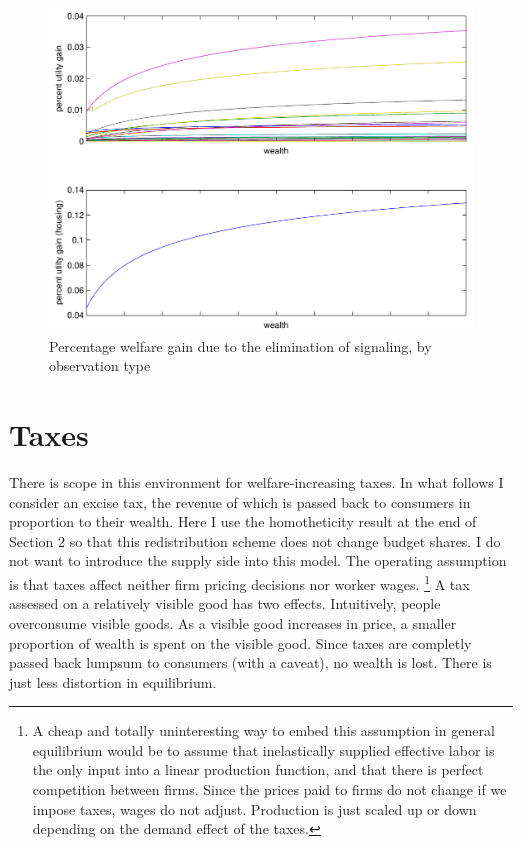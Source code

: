 \documentclass{article}
\begin{document}
\begin{figure}
	\begin{center}
		\includegraphics[scale=.8]{pics/uchnge_cropped.pdf}
	\end{center}
	\caption{Percentage welfare gain due to the elimination of signaling, by observation type}
	\label{fig:uchnge}
\end{figure}

\section{Taxes}
There is scope in this environment for welfare-increasing taxes.  
In what follows I consider an excise tax, the revenue of which is passed back to consumers in proportion to their wealth.
Here I use the homotheticity result at the end of Section 2 so that this redistribution scheme does not change budget shares.
I do not want to introduce the supply side into this model.
The operating assumption is that taxes affect neither firm pricing decisions nor worker wages.
\footnote{
A cheap and totally uninteresting way to embed this assumption in general equilibrium would be to assume that inelastically supplied effective labor is the only input into a linear production function, and that there is perfect competition between firms.
Since the prices paid to firms do not change if we impose taxes, wages do not adjust.
Production is just scaled up or down depending on the demand effect of the taxes.
}
A tax assessed on a relatively visible good has two effects.
Intuitively, people overconsume visible goods.
As a visible good increases in price, a smaller proportion of wealth is spent on the visible good.
Since taxes are completly passed back lumpsum to consumers (with a caveat), no wealth is lost.
There is just less distortion in equilibrium.
\end{document}
